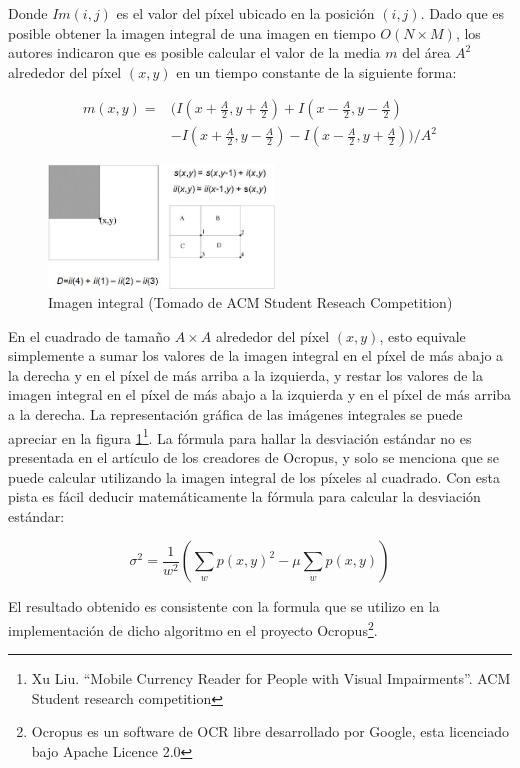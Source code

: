 \documentclass[a4paper, 11pt, oneside]{report}
\begin{document}
Donde $Im(i, j)$ es el valor del píxel ubicado en la posición $(i, j)$. Dado que es posible obtener la imagen integral de una imagen en tiempo $O(N \times M)$, los autores indicaron que es posible calcular el valor de la media $m$ del área $A^{2}$ alrededor del píxel $(x, y)$ en un tiempo constante de la siguiente forma:

\begin{align*}
  m(x, y) =& (I(x + \frac{A}{2}, y + \frac{A}{2}) + I(x - \frac{A}{2}, y - \frac{A}{2}) \\
	   &- I(x + \frac{A}{2}, y - \frac{A}{2}) - I(x - \frac{A}{2}, y + \frac{A}{2})) / A^{2}
\end{align*}

\begin{figure}[htb]
\begin{center}
\leavevmode
\includegraphics[width=6cm]{img/integral.png}
\end{center}
\caption{Imagen integral (Tomado de ACM Student Reseach Competition)}
\label{fig:integral}
\end{figure}

En el cuadrado de tamaño $A \times A$ alrededor del píxel $(x, y)$, esto equivale simplemente a sumar los valores de la imagen integral en el píxel de más abajo a la derecha y en el píxel de más arriba a la izquierda, y restar los valores de la imagen integral en el píxel de más abajo a la izquierda y en el píxel de más arriba a la derecha. La representación gráfica de las imágenes integrales se puede apreciar en la figura \ref{fig:integral}\footnote{Xu Liu. ``Mobile Currency Reader for People with Visual Impairments''. ACM Student research competition}. La fórmula para hallar la desviación estándar no es presentada en el artículo de los creadores de Ocropus, y solo se menciona que se puede calcular utilizando la imagen integral de los píxeles al cuadrado. Con esta pista es fácil deducir matemáticamente la fórmula para calcular la desviación estándar:

\[ \sigma^2 = \frac{1}{w^2}\left(\sum_w{p(x,y)^2} - \mu \sum_w{p(x,y)}\right) \]

El resultado obtenido es consistente con la formula que se utilizo en la implementación de dicho algoritmo en el proyecto Ocropus\footnote{Ocropus es un software de OCR libre desarrollado por Google, esta licenciado bajo Apache Licence 2.0}.
\end{document}
